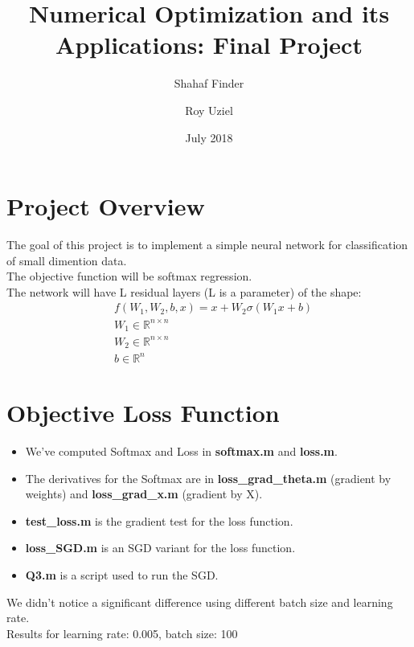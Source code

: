 \documentclass{article}
\title{Numerical Optimization and its Applications: Final Project}
\author{
    Shahaf Finder
    \and
    Roy Uziel
}
\date{July 2018}
\numberwithin{equation}{section}
\begin{document}
\maketitle

\section{Project Overview}
The goal of this project is to implement a simple neural network for classification of small dimention data.\\

The objective function will be softmax regression.\\
The network will have L residual layers (L is a parameter) of the shape:
\begin{equation*}
\begin{split}
 &  f(W_1, W_2, b, x) = x + W_2 \sigma (W_1 x + b)\\
 & W_1 \in \mathbb{R}^{n \times n}\\
 & W_2 \in \mathbb{R}^{n \times n}\\
 & b \in \mathbb{R}^{n}
\end{split}
\end{equation*}

\section{Objective Loss Function}
\begin{itemize}
 \item
  We've computed Softmax and Loss in \textbf{softmax.m} and \textbf{loss.m}.
  \item
  The derivatives for the Softmax are in \textbf{loss{\_}grad{\_}theta.m} (gradient by weights) and \textbf{loss{\_}grad{\_}x.m} (gradient by X).
  \item
  \textbf{test{\_}loss.m} is the gradient test for the loss function.
  \item
 \textbf{ loss{\_}SGD.m} is an SGD variant for the loss function.
  \item
  \textbf{Q3.m} is a script used to run the SGD.
\end{itemize}
We didn't notice a significant difference using different batch size and learning rate.\\

Results for learning rate: 0.005, batch size: 100\\
\end{document}
